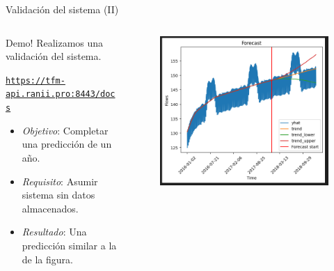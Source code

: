 \documentclass[aspectratio=169,xcolor=dvipsnames]{beamer}
\begin{document}
	\begin{frame}{Validación del sistema (II)}
		\begin{columns}
			\begin{column}{0.52\textwidth}
				\begin{alertblock}{Demo!}
					Realizamos una validación del sistema.
					
					\vspace{12px}
					
					\href{https://tfm-api.ranii.pro:8443/docs}{\small \texttt{https://tfm-api.ranii.pro:8443/docs}}
					
					\vspace{12px}
					 
					\begin{itemize}
						\item \textit{Objetivo}: Completar una predicción de un año. 
						\item \textit{Requisito}: Asumir sistema sin datos almacenados.
						\item \textit{Resultado}: Una predicción similar a la de la figura.
					\end{itemize}
				\end{alertblock}
			\end{column}
		
			\begin{column}{0.5\textwidth}
				\begin{figure}[h!]
					\begin{center}
						\includegraphics[width=1\textwidth]{img/graph_forecast_2.png}
					\end{center}
				\end{figure}
			\end{column}
		\end{columns}
	\end{frame}
	
\end{document}
